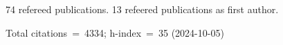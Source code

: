 74 refereed publications. 13 refeered publications as first author.

Total citations~=~4334; h-index~=~35 (2024-10-05)